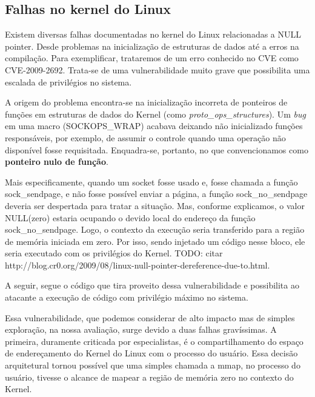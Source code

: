 		
		\subsection{Falhas no kernel do Linux}
		\label{subsec:linux_kernel_vuln}
			Existem diversas falhas documentadas no kernel do Linux relacionadas a NULL pointer.
			Desde problemas na inicialização de estruturas de dados até a erros na compilação.		
			Para exemplificar, trataremos de um erro conhecido no CVE como CVE-2009-2692.
			Trata-se de uma vulnerabilidade muito grave que possibilita uma escalada de privilégios
			no sistema.
			
			
			A origem do problema encontra-se na inicialização incorreta de ponteiros de funções em estruturas
			de dados do Kernel (como \textsl{proto\_ops\_structures}). 
			Um \textsl{bug} em uma macro (SOCKOPS\_WRAP) acabava deixando não inicializado
			funções responsáveis, por exemplo, de assumir o controle quando uma operação não disponível fosse
			requisitada. Enquadra-se, portanto, no que convencionamos como \textbf{ponteiro nulo de função}.

			
			Mais especificamente, quando um socket fosse usado e, fosse chamada a função sock\_sendpage,
			e não fosse possível enviar a página, a função sock\_no\_sendpage deveria ser despertada
			para tratar a situação. Mas, conforme explicamos, o valor NULL(zero) estaria ocupando o devido
			local do endereço da função sock\_no\_sendpage. Logo, o contexto da execução seria transferido
			para a região de memória iniciada em zero. Por isso, sendo injetado um código nesse bloco,
			ele seria executado com os privilégios do Kernel.
			TODO: citar http://blog.cr0.org/2009/08/linux-null-pointer-dereference-due-to.html.

	
			A seguir, segue o código que tira proveito dessa vulnerabilidade e possibilita ao atacante
			a execução de código com privilégio máximo no sistema.  
			

			
			Essa vulnerabilidade, que podemos considerar de alto impacto mas de simples exploração,
			na nossa avaliação, surge devido a duas falhas gravíssimas.
			A primeira, duramente criticada por especialistas, é o compartilhamento do espaço de endereçamento
			do Kernel do Linux com o processo do usuário. Essa decisão arquitetural
			tornou possível que uma simples chamada a mmap, no processo do usuário, tivesse o alcance de
			mapear a região de memória zero no contexto do Kernel. 
		


